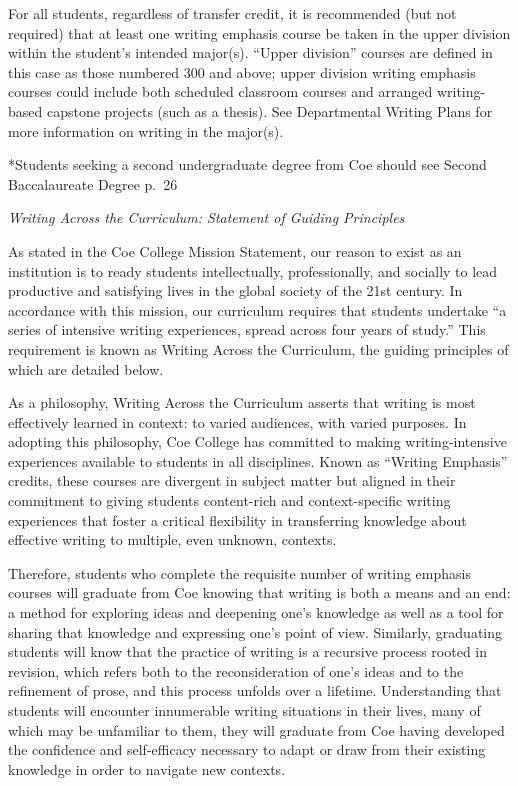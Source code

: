 \documentclass[
  letterpaper,
]{scrbook}
\begin{document}
For all students, regardless of transfer credit, it is recommended (but
not required) that at least one writing emphasis course be taken in the
upper division within the student's intended major(s). ``Upper
division'' courses are defined in this case as those numbered 300 and
above; upper division writing emphasis courses could include both
scheduled classroom courses and arranged writing-based capstone projects
(such as a thesis). See Departmental Writing Plans for more information
on writing in the major(s).

*Students seeking a second undergraduate degree from Coe should see
Second Baccalaureate Degree p.~26

\emph{Writing Across the Curriculum: Statement of Guiding Principles}

As stated in the Coe College Mission Statement, our reason to exist as
an institution is to ready students intellectually, professionally, and
socially to lead productive and satisfying lives in the global society
of the 21st century. In accordance with this mission, our curriculum
requires that students undertake ``a series of intensive writing
experiences, spread across four years of study.'' This requirement is
known as Writing Across the Curriculum, the guiding principles of which
are detailed below.

As a philosophy, Writing Across the Curriculum asserts that writing is
most effectively learned in context: to varied audiences, with varied
purposes. In adopting this philosophy, Coe College has committed to
making writing-intensive experiences available to students in all
disciplines. Known as ``Writing Emphasis'' credits, these courses are
divergent in subject matter but aligned in their commitment to giving
students content-rich and context-specific writing experiences that
foster a critical flexibility in transferring knowledge about effective
writing to multiple, even unknown, contexts.

Therefore, students who complete the requisite number of writing
emphasis courses will graduate from Coe knowing that writing is both a
means and an end: a method for exploring ideas and deepening one's
knowledge as well as a tool for sharing that knowledge and expressing
one's point of view. Similarly, graduating students will know that the
practice of writing is a recursive process rooted in revision, which
refers both to the reconsideration of one's ideas and to the refinement
of prose, and this process unfolds over a lifetime. Understanding that
students will encounter innumerable writing situations in their lives,
many of which may be unfamiliar to them, they will graduate from Coe
having developed the confidence and self-efficacy necessary to adapt or
draw from their existing knowledge in order to navigate new contexts.
\end{document}
